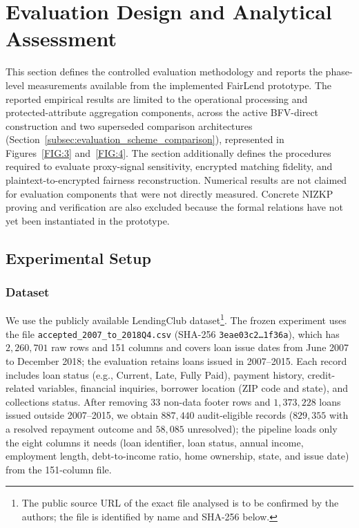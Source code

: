 \documentclass[a4paper,fleqn]{cas-dc}
\begin{document}
\section{Evaluation Design and Analytical Assessment}
\label{sec:experiments}
This section defines the controlled evaluation methodology and reports the phase-level measurements available from the implemented FairLend prototype. The reported empirical results are limited to the operational processing and protected-attribute aggregation components, across the active BFV-direct construction and two superseded comparison architectures (Section~\ref{subsec:evaluation_scheme_comparison}), represented in Figures~\ref{FIG:3} and~\ref{FIG:4}. The section additionally defines the procedures required to evaluate proxy-signal sensitivity, encrypted matching fidelity, and plaintext-to-encrypted fairness reconstruction. Numerical results are not claimed for evaluation components that were not directly measured. Concrete NIZKP proving and verification are also excluded because the formal relations have not yet been instantiated in the prototype.

\subsection{Experimental Setup}
\label{subsec:setup}

\subsubsection{Dataset}
We use the publicly available LendingClub dataset\footnote{The public source URL of the exact file analysed is to be confirmed by the authors; the file is identified by name and SHA-256 below.}.
The frozen experiment uses the file \texttt{accepted\_2007\_to\_2018Q4.csv} (SHA-256 \texttt{3eae03c2\ldots1f36a}), which has $2{,}260{,}701$ raw rows and 151 columns and covers loan issue dates from June 2007 to December 2018; the evaluation retains loans issued in 2007--2015. Each record includes loan status (e.g., Current, Late, Fully Paid), payment history, credit-related variables, financial inquiries, borrower location (ZIP code and state), and collections status. After removing 33 non-data footer rows and $1{,}373{,}228$ loans issued outside 2007--2015, we obtain $887{,}440$ audit-eligible records ($829{,}355$ with a resolved repayment outcome and $58{,}085$ unresolved); the pipeline loads only the eight columns it needs (loan identifier, loan status, annual income, employment length, debt-to-income ratio, home ownership, state, and issue date) from the 151-column file.
\end{document}
